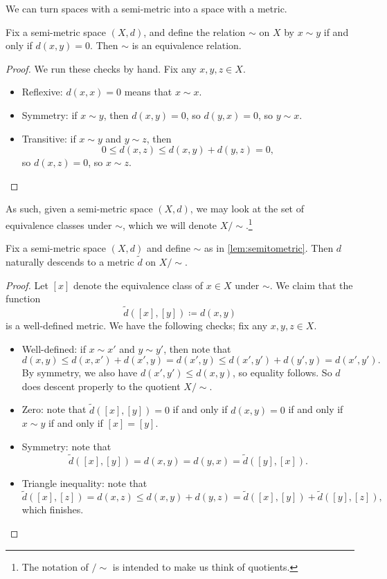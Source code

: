 \documentclass[../notes.tex]{subfiles}
\begin{document}
We can turn spaces with a semi-metric into a space with a metric.
\begin{lemma} \label{lem:semitometric}
	Fix a semi-metric space $(X,d)$, and define the relation $\sim$ on $X$ by $x\sim y$ if and only if $d(x,y)=0$. Then $\sim$ is an equivalence relation.
\end{lemma}
\begin{proof}
	We run these checks by hand. Fix any $x,y,z\in X$.
	\begin{itemize}
		\item Reflexive: $d(x,x)=0$ means that $x\sim x$.
		\item Symmetry: if $x\sim y$, then $d(x,y)=0$, so $d(y,x)=0$, so $y\sim x$.
		\item Transitive: if $x\sim y$ and $y\sim z$, then
		\[0\le d(x,z)\le d(x,y)+d(y,z)=0,\]
		so $d(x,z)=0$, so $x\sim z$.
		\qedhere
	\end{itemize}
\end{proof}
As such, given a semi-metric space $(X,d)$, we may look at the set of equivalence classes under $\sim$, which we will denote $X/{\sim}$.\footnote{The notation of $/{\sim}$ is intended to make us think of quotients.}
\begin{proposition} \label{prop:semitometric}
	Fix a semi-metric space $(X,d)$ and define $\sim$ as in \autoref{lem:semitometric}. Then $d$ naturally descends to a metric $\widetilde d$ on $X/{\sim}$.
\end{proposition}
\begin{proof}
	Let $[x]$ denote the equivalence class of $x\in X$ under $\sim$. We claim that the function
	\[\widetilde d([x],[y])\coloneqq d(x,y)\]
	is a well-defined metric. We have the following checks; fix any $x,y,z\in X$.
	\begin{itemize}
		\item Well-defined: if $x\sim x'$ and $y\sim y'$, then note that
		\[d(x,y)\le d(x,x')+d(x',y)=d(x',y)\le d(x',y')+d(y',y)=d(x',y').\]
		By symmetry, we also have $d(x',y')\le d(x,y)$, so equality follows. So $d$ does descent properly to the quotient $X/{\sim}$.
		\item Zero: note that $\widetilde d([x],[y])=0$ if and only if $d(x,y)=0$ if and only if $x\sim y$ if and only if $[x]=[y]$.
		\item Symmetry: note that
		\[\widetilde d([x],[y])=d(x,y)=d(y,x)=\widetilde d([y],[x]).\]
		\item Triangle inequality: note that
		\[\widetilde d([x],[z])=d(x,z)\le d(x,y)+d(y,z)=\widetilde d([x],[y])+\widetilde d([y],[z]),\]
		which finishes.
		\qedhere
	\end{itemize}
\end{proof}
\end{document}
